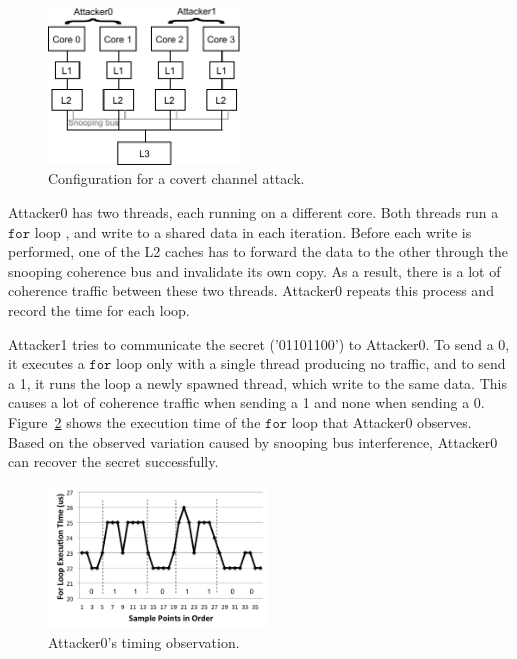 \begin{figure}
    \begin{center}
        \includegraphics[width=2in]{figs/coherent_system.pdf}
        \caption{Configuration for a covert channel attack.}
        \label{fig:coherent_system}
		\vspace{-0.2in}
    \end{center}
\end{figure}

Attacker0 has two threads, each running on a different core. Both threads run a 
$\mathtt{for }$ loop , and write to a shared data in each iteration.
Before each write is performed, one of the L2 caches has to forward the data
to the other through the snooping coherence bus and invalidate its own copy.
As a result, there is a lot of coherence traffic between these two threads.
Attacker0 repeats this process and record the time for each loop.

Attacker1 tries to communicate the secret ('01101100') to Attacker0.
To send a 0, it executes a $\mathtt{for }$ loop only with a single thread 
producing no traffic, and to send a 1, it runs the loop a newly spawned thread, 
which write to the same data. This causes a lot of coherence traffic when 
sending a 1 and none when sending a 0.
Figure~\ref{fig:coherence_interference} shows the execution time of the $\mathtt{for }$ 
loop that Attacker0 observes.
Based on the observed variation caused by snooping bus interference, Attacker0
can recover the secret successfully.

\begin{figure}
    \begin{center}
        \includegraphics[width=2.3in]{figs/coherence_interference.pdf}
        \caption{Attacker0's timing observation.}
        \label{fig:coherence_interference}
		\vspace{-0.2in}
    \end{center}
\end{figure}


